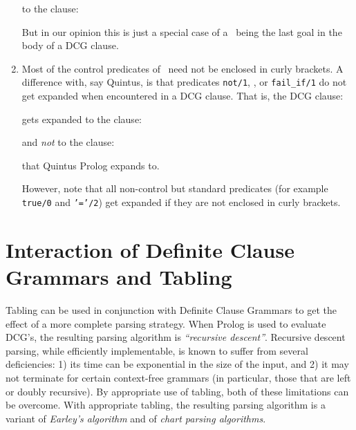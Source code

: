 \begin{enumerate}

      \noindent
      to the clause:


      \noindent 
      But in our opinion this is just a special case of a \cut\ being
      the last goal in the body of a DCG clause.

\item Most of the control predicates of \ourprolog\ need not be enclosed in
      curly brackets.  A difference with, say Quintus, is that predicates
      {\tt not/1}, {\not}, or {\tt fail\_if/1} do not get expanded when
      encountered in a DCG clause.  That is, the DCG clause:


      \noindent
      gets expanded to the clause:


      and {\em not\/} to the clause:


      \noindent
      that Quintus Prolog expands to.

      However, note that all non-control but standard predicates (for example 
      {\tt true/0} and {\tt '='/2}) get expanded if they are not enclosed in 
      curly brackets.
\end{enumerate}

\section{Interaction of Definite Clause Grammars and Tabling}
\label{dcg_tabling}

Tabling can be used in conjunction with Definite Clause Grammars to get the
effect of a more complete parsing strategy.  When Prolog is used to evaluate
DCG's, the resulting parsing algorithm is {\em ``recursive descent''}.
Recursive descent parsing, while efficiently implementable, is known to
suffer from several deficiencies:  1) its time can be exponential in the size
of the input, and 2) it may not terminate for certain context-free grammars (in
particular, those that are left or doubly recursive).  By appropriate use of
tabling, both of these limitations can be overcome.  With appropriate tabling,
the resulting parsing algorithm is a variant of {\em Earley's algorithm\/} and
of {\em chart parsing algorithms}.

